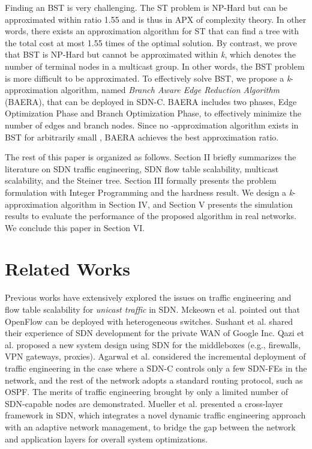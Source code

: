 \documentclass[conference]{IEEEtran}
\begin{document}
Finding an BST is very challenging. The ST problem is NP-Hard but can be
approximated within ratio 1.55 \cite{Robins2000} and is thus in APX of complexity theory. In other words, there exists an approximation algorithm for ST that can find
a tree with the total cost at most 1.55 times of the optimal solution. By
contrast, we prove that BST is NP-Hard but cannot be approximated within
\textit{k}, which denotes the number of terminal nodes in a multicast group. In
other words, the BST problem is more difficult to be approximated. To
effectively solve BST, we propose a \textit{k}-approximation algorithm,
named \textit{Branch Aware Edge Reduction Algorithm} (BAERA), that can be
deployed in SDN-C. BAERA includes
two phases, Edge Optimization Phase and Branch Optimization Phase, to
effectively minimize the number of edges and branch nodes. Since no -approximation algorithm exists in BST for arbitrarily
small , BAERA achieves the best approximation ratio.

{The rest of this paper is organized as follows. Section II briefly
summarizes the literature on SDN traffic engineering, SDN flow table
scalability, multicast scalability, and the Steiner tree. Section III formally
presents the problem formulation with Integer Programming and the hardness
result. We design a \textit{k}-approximation algorithm in Section IV, and
Section V presents the simulation results to evaluate the performance of the
proposed algorithm in real networks. We conclude this paper in Section VI.}

\section{Related Works}

Previous works have extensively explored the issues on traffic engineering
and flow table scalability for \textit{unicast traffic} in SDN. Mckeown et al. \cite{McKeown2008} pointed out that OpenFlow can
be deployed with heterogeneous switches. Sushant et al. \cite{Sushant2013} shared their experience of SDN development for the private WAN of Google Inc.
Qazi et al. \cite{Qazi2013} proposed a new system design using SDN for the middleboxes (e.g., firewalls, VPN gateways, proxies).
Agarwal et al. \cite{Agarwal2013} considered the incremental deployment of traffic engineering in the case
where a SDN-C controls only a few SDN-FEs in the network, and the rest of
the network adopts a standard routing protocol, such as OSPF. The merits of
traffic engineering brought by only a limited number of SDN-capable nodes
are demonstrated. Mueller et al. \cite{Mueller2013} presented a cross-layer framework
in SDN, which integrates a novel dynamic traffic engineering approach with
an adaptive network management, to bridge the gap between the network and
application layers for overall system optimizations.
\end{document}
